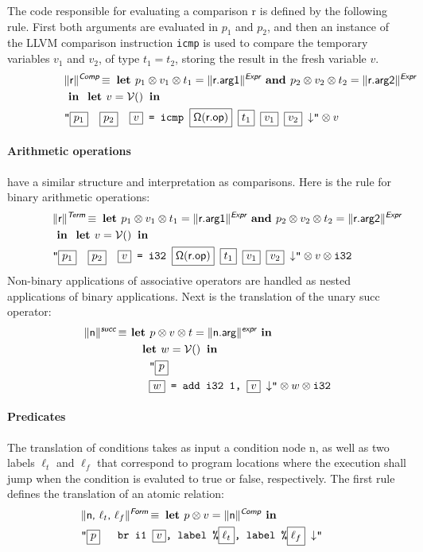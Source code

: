 \documentclass{llncs}
\newcommand{\trad}[2]{\ensuremath{\lVert \textsf{#1} \rVert^{\textit{#2}}}}
\newcommand{\nl}[0]{\ensuremath{\downarrow}}
\DeclareMathOperator{\isdef}{\equiv}
\DeclareMathOperator{\variable}{\mathcal{V}()}
\newcommand{\llvm}[1]{\texttt{#1}}
\newcommand{\B}[1]{\textsf{#1}}
\newcommand{\LET}[0]{\textbf{ let }}
\newcommand{\IN}[0]{\textbf{ in }}
\newcommand{\AND}[0]{\textbf{ and }}
\newcommand{\PH}[1]{\framebox{$#1$}}
\newcommand{\sep}[0]{\otimes}
\newcommand{\opmap}[0]{\ensuremath{\sf\Omega}}
\begin{document}
\begin{enumerate}
The code responsible for evaluating a comparison \B{r} is defined by the
following rule. First both arguments are evaluated in $p_1$ and $p_2$, and then
an instance of the LLVM comparison instruction \llvm{icmp} is used to compare
the temporary variables $v_1$ and $v_2$, of type $t_1 = t_2$, storing the result
in the fresh variable $v$.
\begin{align*}
\lefteqn{\trad{r}{\B{Comp}} \isdef
  \LET
  p_1 \sep v_1 \sep t_1 = \trad{r.arg1}{\B{Expr}} \AND
  p_2 \sep v_2 \sep t_2 = \trad{r.arg2}{\B{Expr}}} \\
& \IN \LET v = \variable \IN \\
& \llvm{"\PH{p_1}\quad\PH{p_2}\quad\PH{v} = icmp \PH{\opmap(\B{r.op})} \PH{t_1} \PH{v_1} \PH{v_2} \nl"} \sep v
\end{align*}
   
\paragraph{Arithmetic operations} have a similar 
structure and interpretation as comparisons. Here is the rule for binary
arithmetic operations:
\begin{align*}
\lefteqn{\trad{r}{\B{Term}} \isdef
  \LET
  p_1 \sep v_1 \sep t_1 = \trad{r.arg1}{\B{Expr}} \AND
  p_2 \sep v_2 \sep t_2 = \trad{r.arg2}{\B{Expr}}} \\
& \IN \LET v = \variable \IN \\
& \llvm{"\PH{p_1}\quad\PH{p_2}\quad\PH{v} = i32 \PH{\opmap(\B{r.op})} \PH{t_1} \PH{v_1} \PH{v_2} \nl"} \sep v \sep \llvm{i32}
\end{align*}
Non-binary applications of associative operators are handled as nested
applications of binary applications. Next is the translation of the unary
\B{succ} operator:
\begin{align*}
  \trad{n}{\B{succ}} \isdef & \textbf{ let } p \sep v \sep t = \trad{n.arg}{\B{expr}} \IN  \\
  & \quad \LET w = \variable \IN \\
  & \quad \quad \llvm{"\PH{p}} \\
  & \quad \quad \llvm{\PH{w} = add i32 1, \PH{v} \nl"} \sep w \sep \llvm{i32}
\end{align*}

\paragraph{Predicates}
The translation of conditions takes as input a condition node \B{n}, as well as
two labels $\ell_t$ and $\ell_f$ that correspond to program locations where the
execution shall jump when the condition is evaluted to true or false,
respectively.  The first rule defines the translation of an atomic relation:
\begin{align*}
  \lefteqn{\trad{n, $\ell_t$, $\ell_f$}{\B{Form}} \isdef
  \textbf{ let } p \sep v = \trad{n}{\B{Comp}} \IN} \\
  & \llvm{"\PH{p} \quad br i1 \PH{v}, label \%\PH{\ell_t}, label \%\PH{\ell_f} \nl"}
\end{align*}


\end{enumerate}
\end{document}

